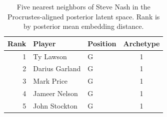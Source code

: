 \begin{table}[htbp]
  \centering\small
  \begin{tabular}{rllc}
    \toprule
    Rank & Player & Position & Archetype \\
    \midrule
    1 & Ty Lawson & G & 1 \\
    2 & Darius Garland & G & 1 \\
    3 & Mark Price & G & 1 \\
    4 & Jameer Nelson & G & 1 \\
    5 & John Stockton & G & 1 \\
    \bottomrule
  \end{tabular}
  \caption{Five nearest neighbors of Steve Nash in the Procrustes-aligned posterior latent space. Rank is by posterior mean embedding distance.}
  \label{tab:Steve_Nash_neighbors}
\end{table}

